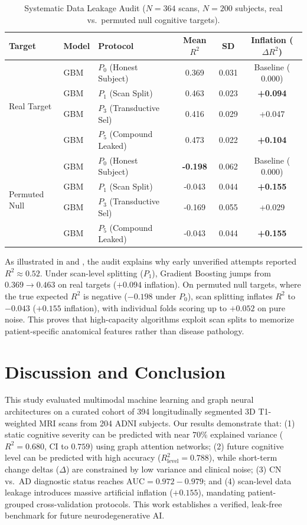 \documentclass[journal,twocolumn]{IEEEtran}
\begin{document}
\begin{table}[h]
\centering
\caption{Systematic Data Leakage Audit ($N=364$ scans, $N=200$ subjects, real vs.\ permuted null cognitive targets).}
\label{tab:leakage}
\begin{tabular}{lllccc}
\toprule
Target & Model & Protocol & Mean $R^2$ & SD & Inflation ($\Delta R^2$) \\
\midrule
\multirow{4}{*}{Real Target} 
 & GBM & $P_0$ (Honest Subject) & 0.369 & 0.031 & Baseline ($0.000$) \\
 & GBM & $P_1$ (Scan Split) & 0.463 & 0.023 & \textbf{+0.094} \\
 & GBM & $P_3$ (Transductive Sel) & 0.416 & 0.029 & +0.047 \\
 & GBM & $P_5$ (Compound Leaked) & 0.473 & 0.022 & \textbf{+0.104} \\
\midrule
\multirow{4}{*}{Permuted Null} 
 & GBM & $P_0$ (Honest Subject) & \textbf{-0.198} & 0.062 & Baseline ($0.000$) \\
 & GBM & $P_1$ (Scan Split) & -0.043 & 0.044 & \textbf{+0.155} \\
 & GBM & $P_3$ (Transductive Sel) & -0.169 & 0.055 & +0.029 \\
 & GBM & $P_5$ (Compound Leaked) & -0.043 & 0.044 & \textbf{+0.155} \\
\bottomrule
\end{tabular}
\end{table}

As illustrated in  and , the audit explains why early unverified attempts reported $R^2 \approx 0.52$. Under scan-level splitting ($P_1$), Gradient Boosting jumps from $0.369 \to 0.463$ on real targets ($+0.094$ inflation). On permuted null targets, where the true expected $R^2$ is negative ($-0.198$ under $P_0$), scan splitting inflates $R^2$ to $-0.043$ ($+0.155$ inflation), with individual folds scoring up to $+0.052$ on pure noise. This proves that high-capacity algorithms exploit scan splits to memorize patient-specific anatomical features rather than disease pathology.

\section{Discussion and Conclusion}
\label{sec:conclusion}
This study evaluated multimodal machine learning and graph neural architectures on a curated cohort of 394 longitudinally segmented 3D T1-weighted MRI scans from 204 ADNI subjects. Our results demonstrate that: (1) static cognitive severity can be predicted with near $70\%$ explained variance ($R^2 = 0.680$, CI to $0.759$) using graph attention networks; (2) future cognitive level can be predicted with high accuracy ($R^2_{\text{level}} = 0.788$), while short-term change deltas ($\Delta$) are constrained by low variance and clinical noise; (3) CN vs.\ AD diagnostic status reaches $\text{AUC} = 0.972 - 0.979$; and (4) scan-level data leakage introduces massive artificial inflation ($+0.155$), mandating patient-grouped cross-validation protocols. This work establishes a verified, leak-free benchmark for future neurodegenerative AI.
\end{document}
